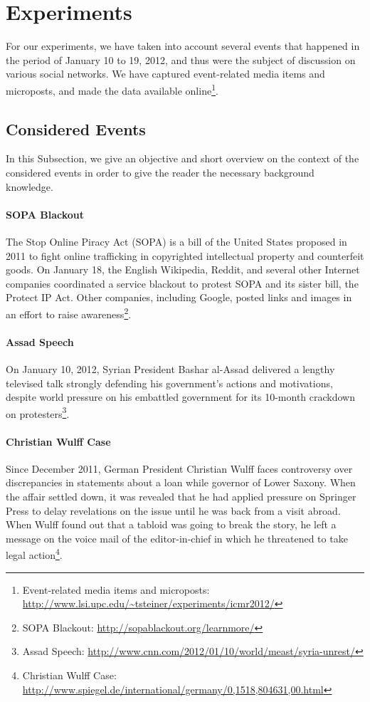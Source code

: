 \documentclass{acm_proc_article-sp}
\newcommand{\inlinelistingsize}{\fontsize{8pt}{11pt}}
\let\oldurl\url
\renewcommand{\url}[1]{\inlinelistingsize\oldurl{#1}}
\begin{document}
\section{Experiments}
\label{sec:experiments}
For our experiments, we have taken into account several events that happened in the period of January 10 to 19, 2012, and thus were the subject of discussion on various social networks.
We have captured event-related media items and microposts, and made the data available online\footnote{Event-related media items and microposts: \url{http://www.lsi.upc.edu/~tsteiner/experiments/icmr2012/}}. 

\subsection{Considered Events}
In this Subsection, we give an objective and short overview on the context of the considered events in order to give the reader the necessary background knowledge.

\paragraph{SOPA Blackout}
The Stop Online Piracy Act (SOPA) is a bill of the United States proposed in 2011 to fight online trafficking in copyrighted intellectual property and counterfeit goods.
On January 18, the English Wikipedia, Reddit, and several other Internet companies coordinated a service blackout to protest SOPA and its sister bill, the Protect IP Act.
Other companies, including Google, posted links and images in an effort to raise awareness\footnote{SOPA Blackout: \url{http://sopablackout.org/learnmore/}}.

\paragraph{Assad Speech}
On January 10, 2012, Syrian President Bashar al-Assad delivered a lengthy televised talk strongly defending his government's actions and motivations, despite world pressure on his embattled government for its 10-month crackdown on protesters\footnote{Assad Speech: \url{http://www.cnn.com/2012/01/10/world/meast/syria-unrest/}}. 

\paragraph{Christian Wulff Case}
Since December 2011, German President Christian Wulff faces controversy over discrepancies in statements about a loan while governor of Lower Saxony.
When the affair settled down, it was revealed that he had applied pressure on Springer Press to delay revelations on the issue until he was back from a visit abroad.
When Wulff found out that a tabloid was going to break the story, he left a message on the voice mail of the editor-in-chief in which he threatened to take legal action\footnote{Christian Wulff Case: \url{http://www.spiegel.de/international/germany/0,1518,804631,00.html}}.
\end{document}
